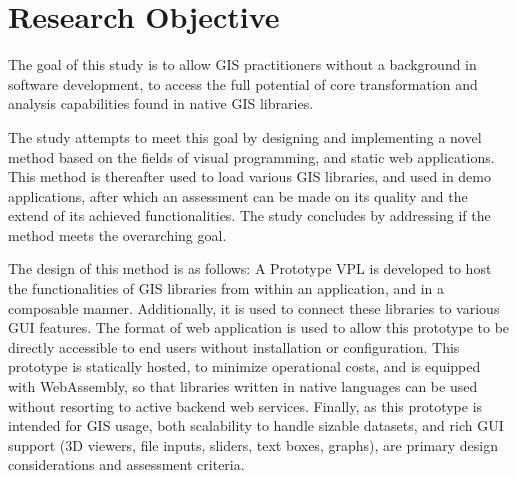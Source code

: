 

\section{Research Objective}

The goal of this study is to allow \ac{GIS} practitioners without a background in software development, to access the full potential of core transformation and analysis capabilities found in native \ac{GIS} libraries.

The study attempts to meet this goal by designing and implementing a novel method based on 
the fields of visual programming, and static web applications. 
This method is thereafter used to load various \ac{GIS} libraries, and used in demo applications, after which an assessment can be made on its quality and the extend of its achieved functionalities. 
The study concludes by addressing if the method meets the overarching goal.


The design of this method is as follows: 
A Prototype VPL is developed to host the functionalities of \ac{GIS} libraries from within an application, and in a composable manner. Additionally, it is used to connect these libraries to various \ac{GUI} features. 
The format of web application is used to allow this prototype to be directly accessible to end users without installation or configuration. 
This prototype is statically hosted, to minimize operational costs, and is equipped with WebAssembly, so that libraries written in native languages can be used without resorting to active backend web services. 
Finally, as this prototype is intended for \ac{GIS} usage, both scalability to handle sizable datasets, and rich \ac{GUI} support (3D viewers, file inputs, sliders, text boxes, graphs), are primary design considerations and assessment criteria. 

